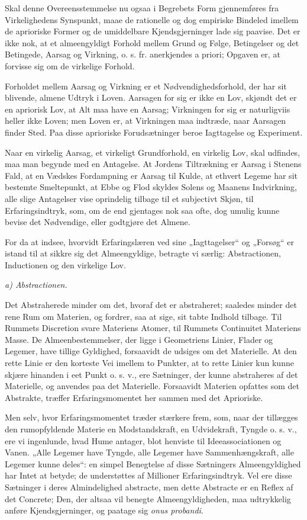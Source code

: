 \documentclass[12pt]{book}
\newcommand{\opage}[1]{\marginnote{\footnotesize\textit{[#1]}}}
\begin{document}
Skal denne Overeensstemmelse nu ogsaa i Begrebets Form gjennemføres fra Virkelighedens
Synspunkt, maae de rationelle og dog empiriske Bindeled imellem de aprioriske Former
og de umiddelbare Kjendsgjerninger lade sig paavise. Det er ikke nok, at et
almeengyldigt Forhold mellem Grund og Følge, Betingelser og det Betingede, Aarsag og
Virkning, o. s. fr. anerkjendes a priori; Opgaven er, at forvisse sig om de virkelige
Forhold.

Forholdet mellem Aarsag og Virkning er et Nødvendighedsforhold, der har sit blivende,
almene Udtryk i Loven. Aarsagen for sig er ikke en Lov, skjøndt det er en apriorisk
Lov, at Alt maa have en Aarsag; Virkningen for sig er naturligviis heller ikke Loven;
men Loven er, at Virkningen maa indtræde, naar Aarsagen finder Sted. Paa disse
aprioriske Forudsætninger beroe Iagttagelse og Experiment.

Naar en virkelig Aarsag, et virkeligt Grundforhold, en virkelig Lov, skal udfindes,
maa man begynde med en Antagelse. At Jordens Tiltrækning er Aarsag i Stenens Fald, at
en Vædskes Fordampning er Aarsag til Kulde, at ethvert Legeme har sit bestemte
Smeltepunkt, at Ebbe og Flod skyldes Solens og Maanens Indvirkning, alle slige
Antagelser vise oprindelig tilbage til et subjectivt Skjøn, til Erfaringsindtryk, som,
om de end gjentages nok saa ofte, dog umulig kunne bevise det Nødvendige, eller
godtgjøre det Almene.

\opage{54} For da at indsee, hvorvidt Erfaringslæren ved sine „Iagttagelser“ og „Forsøg“ er
istand til at sikkre sig det Almeengyldige, betragte vi særlig: Abstractionen,
Inductionen og den virkelige Lov.

\emph{a) Abstractionen.}

Det Abstraherede minder om det, hvoraf det er abstraheret; saaledes minder det rene
Rum om Materien, og fordrer, saa at sige, sit tabte Indhold tilbage. Til Rummets
Discretion svare Materiens Atomer, til Rummets Continuitet Materiens Masse. De
Almeenbestemmelser, der ligge i Geometriens Linier, Flader og Legemer, have tillige
Gyldighed, forsaavidt de udsiges om det Materielle. At den rette Linie er den korteste
Vei imellem to Punkter, at to rette Linier kun kunne skjære hinanden i eet Punkt o. s.
v., ere Sætninger, der kunne abstraheres af det Materielle, og anvendes paa det
Materielle. Forsaavidt Materien opfattes som det Abstrakte, træffer Erfaringsmomentet
her sammen med det Aprioriske.

Men selv, hvor Erfaringsmomentet træder stærkere frem, som, naar der tillægges den
rumopfyldende Materie en Modstandskraft, en Udvidekraft, Tyngde o. s. v., ere vi
ingenlunde, hvad Hume antager, blot henviste til Ideeassociationen og Vanen. „Alle
Legemer have Tyngde, alle Legemer have Sammenhængskraft, alle Legemer kunne deles“: en
simpel Benegtelse af disse Sætningers Almeengyldighed har Intet at betyde; de
understøttes af Millioner Erfaringsindtryk. Vel ere disse Sætninger i deres
Almindelighed abstracte, men dette Abstracte er en Reflex af det Concrete; Den, der
altsaa vil benegte Almeengyldigheden, maa udtrykkelig anføre Kjendsgjerninger, og
paatage sig \textit{onus probandi}.
\end{document}
